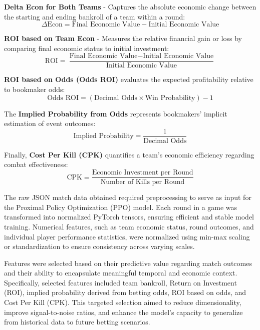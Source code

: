 \documentclass[sigconf]{acmart}
\begin{document}
\textbf{Delta Econ for Both Teams} - Captures the absolute economic change between the starting and ending bankroll of a team within a round:
\begin{equation}
\Delta\text{Econ} = \text{Final Economic Value} - \text{Initial Economic Value}
\end{equation}

\vspace{1em}

\textbf{ROI based on Team Econ} - Measures the relative financial gain or loss by comparing final economic status to initial investment:
\begin{equation}
  \text{ROI} = \frac{\text{Final Economic Value} - \text{Initial Economic Value}}{\text{Initial Economic Value}}
\end{equation}



\textbf{ROI based on Odds (Odds ROI)} evaluates the expected profitability relative to bookmaker odds:
\begin{equation}
\text{Odds ROI} = (\text{Decimal Odds} \times \text{Win Probability}) - 1
\end{equation}

The \textbf{Implied Probability from Odds} represents bookmakers' implicit estimation of event outcomes:
\begin{equation}
\text{Implied Probability} = \frac{1}{\text{Decimal Odds}}
\end{equation}

Finally, \textbf{Cost Per Kill (CPK)} quantifies a team's economic efficiency regarding combat effectiveness:
\begin{equation}
\text{CPK} = \frac{\text{Economic Investment per Round}}{\text{Number of Kills per Round}}
\end{equation}

The raw JSON match data obtained required preprocessing to serve as input for the Proximal Policy Optimization (PPO) model. Each round in a game was transformed into normalized PyTorch tensors, ensuring efficient and stable model training. Numerical features, such as team economic status, round outcomes, and individual player performance statistics, were normalized using min-max scaling or standardization to ensure consistency across varying scales.

Features were selected based on their predictive value regarding match outcomes and their ability to encapsulate meaningful temporal and economic context. Specifically, selected features included team bankroll, Return on Investment (ROI), implied probability derived from betting odds, ROI based on odds, and Cost Per Kill (CPK). This targeted selection aimed to reduce dimensionality, improve signal-to-noise ratios, and enhance the model's capacity to generalize from historical data to future betting scenarios.


\end{document}
